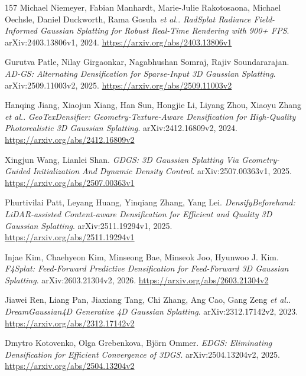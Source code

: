 \documentclass[11pt,a4paper]{article}
\begin{document}
\begin{thebibliography}{157}
Michael Niemeyer, Fabian Manhardt, Marie-Julie Rakotosaona, Michael Oechsle, Daniel Duckworth, Rama Gosula \emph{et al.}.
\newblock \emph{RadSplat Radiance Field-Informed Gaussian Splatting for Robust Real-Time Rendering with 900+ FPS}.
\newblock arXiv:2403.13806v1, 2024.
\newblock \url{https://arxiv.org/abs/2403.13806v1}

Gurutva Patle, Nilay Girgaonkar, Nagabhushan Somraj, Rajiv Soundararajan.
\newblock \emph{AD-GS: Alternating Densification for Sparse-Input 3D Gaussian Splatting}.
\newblock arXiv:2509.11003v2, 2025.
\newblock \url{https://arxiv.org/abs/2509.11003v2}

Hanqing Jiang, Xiaojun Xiang, Han Sun, Hongjie Li, Liyang Zhou, Xiaoyu Zhang \emph{et al.}.
\newblock \emph{GeoTexDensifier: Geometry-Texture-Aware Densification for High-Quality Photorealistic 3D Gaussian Splatting}.
\newblock arXiv:2412.16809v2, 2024.
\newblock \url{https://arxiv.org/abs/2412.16809v2}

Xingjun Wang, Lianlei Shan.
\newblock \emph{GDGS: 3D Gaussian Splatting Via Geometry-Guided Initialization And Dynamic Density Control}.
\newblock arXiv:2507.00363v1, 2025.
\newblock \url{https://arxiv.org/abs/2507.00363v1}

Phurtivilai Patt, Leyang Huang, Yinqiang Zhang, Yang Lei.
\newblock \emph{DensifyBeforehand: LiDAR-assisted Content-aware Densification for Efficient and Quality 3D Gaussian Splatting}.
\newblock arXiv:2511.19294v1, 2025.
\newblock \url{https://arxiv.org/abs/2511.19294v1}

Injae Kim, Chaehyeon Kim, Minseong Bae, Minseok Joo, Hyunwoo J. Kim.
\newblock \emph{F4Splat: Feed-Forward Predictive Densification for Feed-Forward 3D Gaussian Splatting}.
\newblock arXiv:2603.21304v2, 2026.
\newblock \url{https://arxiv.org/abs/2603.21304v2}

Jiawei Ren, Liang Pan, Jiaxiang Tang, Chi Zhang, Ang Cao, Gang Zeng \emph{et al.}.
\newblock \emph{DreamGaussian4D Generative 4D Gaussian Splatting}.
\newblock arXiv:2312.17142v2, 2023.
\newblock \url{https://arxiv.org/abs/2312.17142v2}

Dmytro Kotovenko, Olga Grebenkova, Bj\"{o}rn Ommer.
\newblock \emph{EDGS: Eliminating Densification for Efficient Convergence of 3DGS}.
\newblock arXiv:2504.13204v2, 2025.
\newblock \url{https://arxiv.org/abs/2504.13204v2}


\end{thebibliography}
\end{document}
